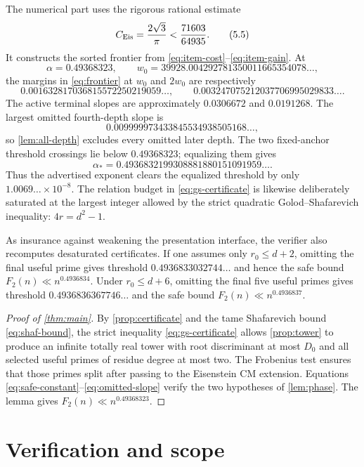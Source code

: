 \documentclass[11pt]{article}
\theoremstyle{definition}
\theoremstyle{remark}
\begin{document}
The numerical part uses the rigorous rational estimate
\[
 C_{\rm Eis}=\frac{2\sqrt3}{\pi}<\frac{71603}{64935}. \tag{5.5}\label{eq:safe-constant}
\]
It constructs the sorted frontier from
\eqref{eq:item-cost}--\eqref{eq:item-gain}.  At
\[
 \alpha=0.49368323,\qquad
 w_0=39928.004292781350011665354078\ldots,         \tag{5.6}
\]
the margins in \eqref{eq:frontier} at $w_0$ and $2w_0$ are respectively
\[
 0.001632817036815572250219059\ldots,
 \qquad
 0.003247075212037706995029833\ldots.              \tag{5.7}\label{eq:margins}
\]
The active terminal slopes are approximately $0.0306672$ and $0.0191268$.
The largest omitted fourth-depth slope is
\[
 0.009999973433845534938505168\ldots,               \tag{5.8}\label{eq:omitted-slope}
\]
so \cref{lem:all-depth} excludes every omitted later depth.  The two
fixed-anchor threshold crossings lie below $0.49368323$; equalizing them
gives
\[
 \alpha_*=0.4936832199308881880151091959\ldots.     \tag{5.9}
\]
Thus the advertised exponent clears the equalized threshold by only
$1.0069\ldots\times10^{-8}$.  The relation budget in
\eqref{eq:gs-certificate} is likewise deliberately saturated at the largest
integer allowed by the strict quadratic Golod--Shafarevich inequality:
$4r=d^2-1$.

As insurance against weakening the presentation interface, the verifier
also recomputes desaturated certificates.  If one assumes only
$r_0\le d+2$, omitting the final useful prime gives threshold
$0.4936833032744\ldots$ and hence the safe bound
$F_2(n)\ll n^{0.4936834}$.  Under $r_0\le d+6$, omitting the final five
useful primes gives threshold $0.4936836367746\ldots$ and the safe bound
$F_2(n)\ll n^{0.4936837}$.

\begin{proof}[Proof of \cref{thm:main}]
By \cref{prop:certificate} and the tame Shafarevich bound
\eqref{eq:shaf-bound}, the strict inequality \eqref{eq:gs-certificate}
allows \cref{prop:tower} to produce an
infinite totally real tower with root discriminant at most $D_0$ and all
selected useful primes of residue degree at most two.  The Frobenius test
ensures that those primes split after passing to the Eisenstein CM
extension.  Equations
\eqref{eq:safe-constant}--\eqref{eq:omitted-slope} verify the two hypotheses of
\cref{lem:phase}.  The lemma gives
$F_2(n)\ll n^{0.49368323}$.
\end{proof}

\section{Verification and scope}
\end{document}
